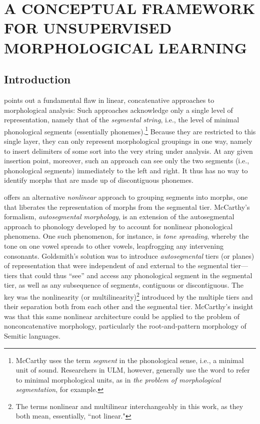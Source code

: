 \chapter{A CONCEPTUAL FRAMEWORK FOR UNSUPERVISED MORPHOLOGICAL LEARNING}
\label{ch:lit-review}

\section{Introduction}

\cite{mccarthy:1981} points out a fundamental flaw in linear, 
concatenative approaches to morphological analysis: 
Such approaches acknowledge only a single level of representation, 
namely that of the \emph{segmental string}, i.e., the level of minimal 
phonological segments (essentially phonemes).\footnote{McCarthy uses
 the term \emph{segment} in the phonological sense, i.e., a minimal unit of sound. 
Researchers in \ac{ULM}, however, generally use the word to 
refer to minimal morphological units, 
as in \textit{the problem of morphological segmentation}, for example.}  
Because they are restricted to this single layer, they can only represent 
morphological groupings in one way, namely to insert delimiters of 
some sort 
into the very string under analysis. At any given
insertion point, 
moreover, such an approach can see only the two segments 
(i.e., phonological segments) immediately to the left and right. It thus
has no way to identify morphs that are made up of discontiguous phonemes.

\cite{mccarthy:1981} offers an alternative \emph{nonlinear} 
approach to grouping segments into morphs, one that liberates the representation of morphs from the segmental tier. McCarthy's formalism, \emph{autosegmental morphology}, is an extension of the autosegmental approach to phonology developed by \citep{goldsmith:1976} to account for nonlinear phonological phenomena. One such phenomenon, for instance, is \emph{tone spreading}, whereby the tone on one vowel spreads to other vowels, leapfrogging any intervening consonants. 
Goldsmith's solution was to introduce \emph{autosegmental} tiers (or planes) of representation that were independent of and external to the segmental tier---tiers that could thus ``see'' and access any phonological segment in the segmental tier, as well as any subsequence of segments, contiguous or discontiguous. The key was the nonlinearity (or multilinearity)\footnote{The terms nonlinear and multilinear interchangeably in this work, as they both mean, essentially, ``not linear."} introduced by the multiple tiers and their separation both from each other and the segmental tier. 
McCarthy's insight was that this same nonlinear architecture could be applied to the problem of nonconcatenative morphology, particularly the root-and-pattern morphology of Semitic languages. 

